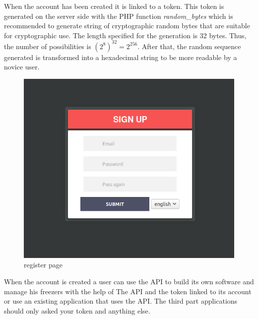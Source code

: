 When the account has been created it is linked to a token. This token is generated on the server side with the PHP function \textit{random\_bytes} which is recommended to generate string of cryptographic random bytes that are suitable for cryptographic use. The length  specified for the generation is 32 bytes. Thus, the number of possibilities is $(2^8)^{32} = 2^{256}$. After that, the random sequence generated is transformed into a hexadecimal string to be more readable by a novice user.\\
\begin{figure}[H]
\centering
\includegraphics[scale=0.4]{./images/register.png}
\caption{register page}
\label{fig:register}
\end{figure}

When the account is created a user can use the API to build its own software and manage his freezers with the help of The API and the token linked to its account or use an existing application that uses the API. The third part applications should only asked your token and anything else.\\

